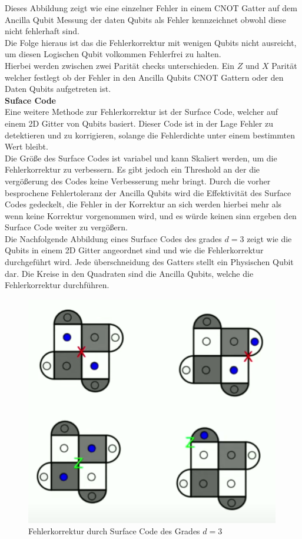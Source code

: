 Dieses Abbildung zeigt wie eine einzelner Fehler in einem CNOT Gatter auf dem Ancilla Qubit Messung der daten Qubits als Fehler kennzeichnet obwohl diese nicht fehlerhaft sind.\\
Die Folge hieraus ist das die Fehlerkorrektur mit wenigen Qubits nicht ausreicht, um diesen Logischen Qubit volkommen Fehlerfrei zu halten.\\

Hierbei werden zwischen zwei Parität checks unterschieden. Ein $Z$ und $X$ Parität welcher festlegt ob der Fehler in den Ancilla Qubits CNOT Gattern oder den Daten Qubits aufgetreten ist.\\

\textbf{Suface Code}\\
Eine weitere Methode zur Fehlerkorrektur ist der Surface Code, welcher auf einem 2D Gitter von Qubits basiert.
Dieser Code ist in der Lage Fehler zu detektieren und zu korrigieren, solange die Fehlerdichte unter einem bestimmten Wert bleibt.\\

Die Größe des Surface Codes ist variabel und kann Skaliert werden, um die Fehlerkorrektur zu verbessern.
Es gibt jedoch ein Threshold an der die vergößerung des Codes keine Verbesserung mehr bringt.
Durch die vorher besprochene Fehlertoleranz der Ancilla Qubits wird die Effektivität des Surface Codes gedeckelt, die Fehler in der Korrektur an sich werden hierbei mehr als wenn keine Korrektur vorgenommen wird, und es würde keinen sinn ergeben den Surface Code weiter zu vergößern.\\

Die Nachfolgende Abbildung eines Surface Codes des grades $d=3$ zeigt wie die Qubits in einem 2D Gitter angeordnet sind und wie die Fehlerkorrektur durchgeführt wird.
Jede überschneidung des Gatters stellt ein Physischen Qubit dar. Die Kreise in den Quadraten sind die Ancilla Qubits, welche die Fehlerkorrektur durchführen.\\

\begin{figure}[H]
    \centering
    \includegraphics[width=0.6\linewidth]{img/Errors.png}
    \caption{Fehlerkorrektur durch Surface Code des Grades $d=3$}
    \label{fig:Surface-Code}
\end{figure}

